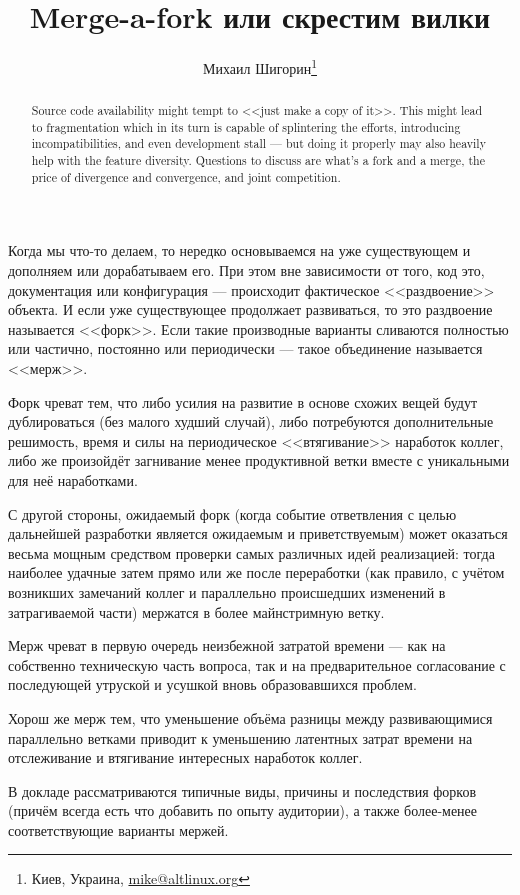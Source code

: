 \documentclass[10pt, a5paper]{article}
\begin{document}
\title{Merge-a-fork или скрестим вилки}
\author{Михаил Шигорин\footnote{Киев, Украина, \url{mike@altlinux.org}}}
\date{}
\maketitle

\begin{abstract}
Source code availability might tempt to <<just make a copy of it>>. This might lead to fragmentation which in its turn is capable of splintering the efforts, introducing incompatibilities, and even development stall --- but doing it properly may also heavily help with the feature diversity.
Questions to discuss are what's a fork and a merge, the price of divergence and convergence, and joint competition.
\end{abstract}

Когда мы что-то делаем, то нередко основываемся на уже существующем и дополняем или дорабатываем его. При этом вне зависимости от того, код это, документация или конфигурация --- происходит фактическое <<раздвоение>> объекта. И если уже существующее продолжает развиваться, то это раздвоение называется <<форк>>. Если такие производные варианты сливаются полностью или частично, постоянно или периодически --- такое объединение называется <<мерж>>.

Форк чреват тем, что либо усилия на развитие в основе схожих вещей будут дублироваться (без малого худший случай), либо потребуются дополнительные решимость, время и силы на периодическое <<втягивание>> наработок коллег, либо же произойдёт загнивание менее продуктивной ветки вместе с уникальными для неё наработками.

С другой стороны, ожидаемый форк (когда событие ответвления с целью дальнейшей разработки является ожидаемым и приветствуемым) может оказаться весьма мощным средством проверки самых различных идей реализацией: тогда наиболее удачные затем прямо или же после переработки (как правило, с учётом возникших замечаний коллег и параллельно происшедших изменений в затрагиваемой части) мержатся в более майнстримную ветку.

Мерж чреват в первую очередь неизбежной затратой времени --- как на собственно техническую часть вопроса, так и на предварительное согласование с последующей утруской и усушкой вновь образовавшихся проблем.

Хорош же мерж тем, что уменьшение объёма разницы между развивающимися параллельно ветками приводит к уменьшению латентных затрат времени на отслеживание и втягивание интересных наработок коллег.

В докладе рассматриваются типичные виды, причины и последствия форков (причём всегда есть что добавить по опыту аудитории), а также более-менее соответствующие варианты мержей.
\end{document}
